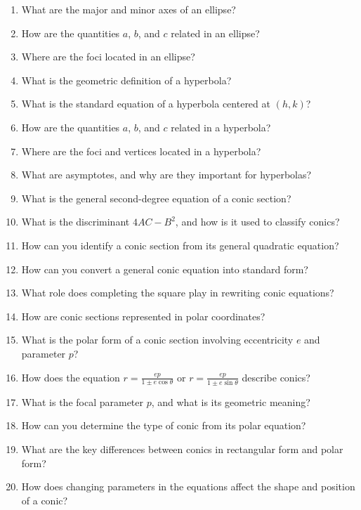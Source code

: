 \begin{enumerate}
\item What are the major and minor axes of an ellipse?

\item How are the quantities $a$, $b$, and $c$ related in an ellipse?

\item Where are the foci located in an ellipse?

\item What is the geometric definition of a hyperbola?

\item What is the standard equation of a hyperbola centered at $(h,k)$?

\item How are the quantities $a$, $b$, and $c$ related in a hyperbola?

\item Where are the foci and vertices located in a hyperbola?

\item What are asymptotes, and why are they important for hyperbolas?

\item What is the general second-degree equation of a conic section?

\item What is the discriminant $4AC - B^2$, and how is it used to classify conics?

\item How can you identify a conic section from its general quadratic equation?

\item How can you convert a general conic equation into standard form?

\item What role does completing the square play in rewriting conic equations?

\item How are conic sections represented in polar coordinates?

\item What is the polar form of a conic section involving eccentricity $e$ and parameter $p$?

\item How does the equation $r = \frac{ep}{1 \pm e\cos\theta}$ or $r = \frac{ep}{1 \pm e\sin\theta}$ describe conics?

\item What is the focal parameter $p$, and what is its geometric meaning?

\item How can you determine the type of conic from its polar equation?

\item What are the key differences between conics in rectangular form and polar form?

\item How does changing parameters in the equations affect the shape and position of a conic?

\end{enumerate}
